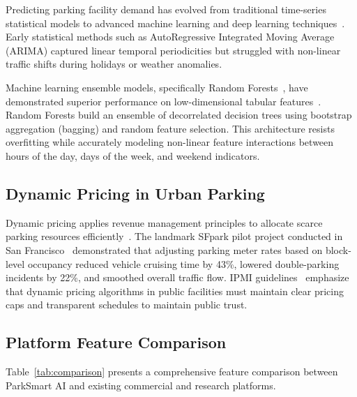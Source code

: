 \documentclass[conference,10pt]{IEEEtran}
\begin{document}
Predicting parking facility demand has evolved from traditional time-series statistical models to advanced machine learning and deep learning techniques~\cite{vlahogianni2016}. Early statistical methods such as AutoRegressive Integrated Moving Average (ARIMA) captured linear temporal periodicities but struggled with non-linear traffic shifts during holidays or weather anomalies.

Machine learning ensemble models, specifically Random Forests~\cite{breiman2001}, have demonstrated superior performance on low-dimensional tabular features~\cite{zheng2015}. Random Forests build an ensemble of decorrelated decision trees using bootstrap aggregation (bagging) and random feature selection. This architecture resists overfitting while accurately modeling non-linear feature interactions between hours of the day, days of the week, and weekend indicators.

\subsection{Dynamic Pricing in Urban Parking}

Dynamic pricing applies revenue management principles to allocate scarce parking resources efficiently~\cite{talluri2004}. The landmark SFpark pilot project conducted in San Francisco~\cite{sfpark2014, pierce2013} demonstrated that adjusting parking meter rates based on block-level occupancy reduced vehicle cruising time by 43\%, lowered double-parking incidents by 22\%, and smoothed overall traffic flow. IPMI guidelines~\cite{ipmi2020} emphasize that dynamic pricing algorithms in public facilities must maintain clear pricing caps and transparent schedules to maintain public trust.

\subsection{Platform Feature Comparison}

Table~\ref{tab:comparison} presents a comprehensive feature comparison between ParkSmart AI and existing commercial and research platforms.
\end{document}
